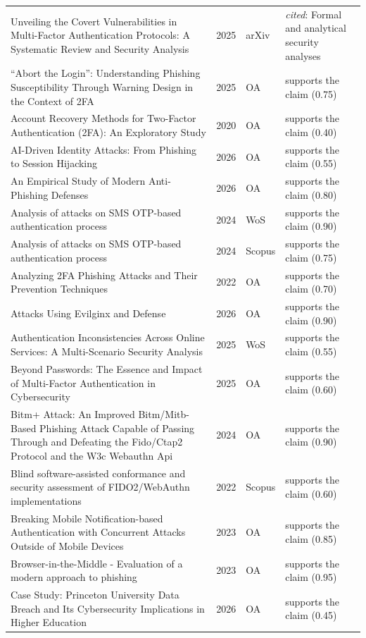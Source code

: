 \begin{longtable}{@{}%
  >{\raggedright\arraybackslash}p{}c%
  >{\raggedright\arraybackslash}p{}%
  >{\raggedright\arraybackslash}p{}@{}}
Unveiling the Covert Vulnerabilities in Multi-Factor Authentication Protocols: A Systematic Review and Security Analysis & 2025 & arXiv & \emph{cited}: Formal and analytical security analyses \\
``Abort the Login'': Understanding Phishing Susceptibility Through Warning Design in the Context of 2FA & 2025 & OA & supports the claim (0.75) \\
Account Recovery Methods for Two-Factor Authentication (2FA): An Exploratory Study & 2020 & OA & supports the claim (0.40) \\
AI-Driven Identity Attacks: From Phishing to Session Hijacking & 2026 & OA & supports the claim (0.55) \\
An Empirical Study of Modern Anti-Phishing Defenses & 2026 & OA & supports the claim (0.80) \\
Analysis of attacks on SMS OTP-based authentication process & 2024 & WoS & supports the claim (0.90) \\
Analysis of attacks on SMS OTP-based authentication process & 2024 & Scopus & supports the claim (0.75) \\
Analyzing 2FA Phishing Attacks and Their Prevention Techniques & 2022 & OA & supports the claim (0.70) \\
Attacks Using Evilginx and Defense & 2026 & OA & supports the claim (0.90) \\
Authentication Inconsistencies Across Online Services: A Multi-Scenario Security Analysis & 2025 & WoS & supports the claim (0.55) \\
Beyond Passwords: The Essence and Impact of Multi-Factor Authentication in Cybersecurity & 2025 & OA & supports the claim (0.60) \\
Bitm+ Attack: An Improved Bitm/Mitb-Based Phishing Attack Capable of Passing Through and Defeating the Fido/Ctap2 Protocol and the W3c Webauthn Api & 2024 & OA & supports the claim (0.90) \\
Blind software-assisted conformance and security assessment of FIDO2/WebAuthn implementations & 2022 & Scopus & supports the claim (0.60) \\
Breaking Mobile Notification-based Authentication with Concurrent Attacks Outside of Mobile Devices & 2023 & OA & supports the claim (0.85) \\
Browser-in-the-Middle - Evaluation of a modern approach to phishing & 2023 & OA & supports the claim (0.95) \\
Case Study: Princeton University Data Breach and Its Cybersecurity Implications in Higher Education & 2026 & OA & supports the claim (0.45) \\

\end{longtable}
